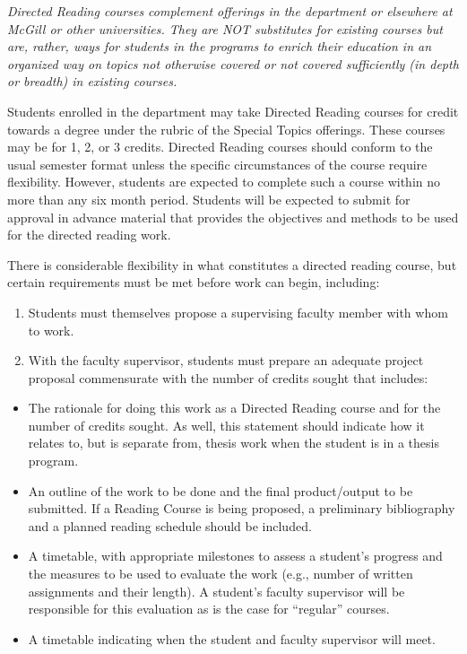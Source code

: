 \documentclass[
  openany]{book}
\begin{document}
\emph{Directed Reading courses complement offerings in the department or elsewhere at McGill or other universities. They are NOT substitutes for existing courses but are, rather, ways for students in the programs to enrich their education in an organized way on topics not otherwise covered or not covered sufficiently (in depth or breadth) in existing courses.}

Students enrolled in the department may take Directed Reading courses for credit towards a degree under the rubric of the Special Topics offerings. These courses may be for 1, 2, or 3 credits. Directed Reading courses should conform to the usual semester format unless the specific circumstances of the course require flexibility. However, students are expected to complete such a course within no more than any six month period. Students will be expected to submit for approval in advance material that provides the objectives and methods to be used for the directed reading work.

There is considerable flexibility in what constitutes a directed reading course, but certain requirements must be met before work can begin, including:

\begin{enumerate}
\def\labelenumi{\arabic{enumi}.}
\item
  Students must themselves propose a supervising faculty member with whom to work.
\item
  With the faculty supervisor, students must prepare an adequate project proposal commensurate with the number of credits sought that includes:
\end{enumerate}

\begin{itemize}
\item
  The rationale for doing this work as a Directed Reading course and for the number of credits sought. As well, this statement should indicate how it relates to, but is separate from, thesis work when the student is in a thesis program.
\item
  An outline of the work to be done and the final product/output to be submitted. If a Reading Course is being proposed, a preliminary bibliography and a planned reading schedule should be included.
\item
  A timetable, with appropriate milestones to assess a student's progress and the measures to be used to evaluate the work (e.g., number of written assignments and their length). A student's faculty supervisor will be responsible for this evaluation as is the case for ``regular'' courses.
\item
  A timetable indicating when the student and faculty supervisor will meet.
\end{itemize}
\end{document}
